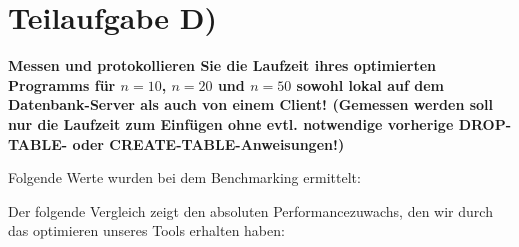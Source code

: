 \section{Teilaufgabe D)}
\textbf{Messen und protokollieren Sie die Laufzeit ihres optimierten Programms
für $n=10$, $n=20$ und $n=50$ sowohl lokal auf dem Datenbank-Server als auch von
einem  Client! (Gemessen werden soll nur die Laufzeit zum Einfügen
ohne evtl. notwendige vorherige DROP-TABLE- oder CREATE-TABLE-Anweisungen!)}

Folgende Werte wurden bei dem Benchmarking ermittelt:


Der folgende Vergleich zeigt den absoluten Performancezuwachs, den wir durch das
optimieren unseres Tools erhalten haben:

